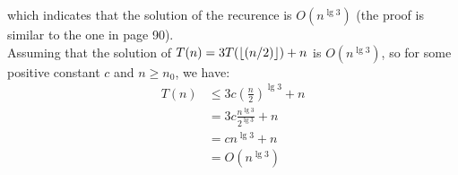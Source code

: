     which indicates that the solution of the recurence is $O(n^{\lg 3})$ (the
    proof is similar to the one in page 90). \\
    Assuming that the solution of $T(n) = 3T(\lfloor(n/2)\rfloor) + n$ is
    $O(n^{\lg 3})$, so for some positive constant $c$ and $n \ge n_0$, we have:
    \begin{align*}
        T(n) & \le 3c(\frac{n}{2})^{\lg 3} + n \\
             & = 3c\frac{n^{\lg 3}}{2^{\lg 3}} + n \\
             & = cn^{\lg 3} + n \\
             & = O(n^{\lg 3})
    \end{align*}
